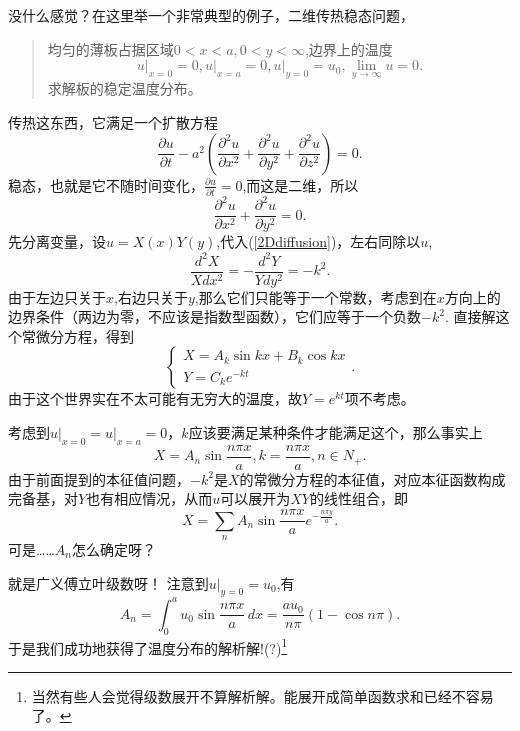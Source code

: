 \documentclass[12pt,a4paper,openany,twoside]{book}
\numberwithin{equation}{section}
\begin{document}
    没什么感觉？在这里举一个非常典型的例子，二维传热稳态问题，
    \begin{quote}
	    均匀的薄板占据区域$0<x<a,0<y<\infty$,边界上的温度
	    \[
		    u\big|_{x=0} = 0, u\big|_{x=a} = 0, u\big|_{y=0} = u_0, \lim_{y \to \infty} u =0
	    .\] 
	    求解板的稳定温度分布。
    \end{quote}
    传热这东西，它满足一个扩散方程
    \begin{equation}
	    \frac{\partial u}{\partial t} -a^2 (\frac{\partial ^2 u}{\partial x^2 } + \frac{\partial^2 u}{\partial y^2} + \frac{\partial ^2 u}{\partial z^2}  ) = 0.
    \end{equation}
    稳态，也就是它不随时间变化，$\frac{\partial u}{\partial t} = 0$,而这是二维，所以
    \begin{equation}
	    \frac{\partial ^2 u}{\partial x^2 } + \frac{\partial ^2 u}{\partial y^2 } = 0.
	    \label{2Ddiffusion}
    \end{equation}
    先分离变量，设$u=X(x)Y(y)$,代入(\ref{2Ddiffusion})，左右同除以$u$,
    \begin{equation}
	     \frac{d ^2 X}{X d x^2} = - \frac{d ^2 Y}{Y d y^2} = -k^2 .
    \end{equation}
    由于左边只关于$x$,右边只关于$y$,那么它们只能等于一个常数，考虑到在$x$方向上的边界条件（两边为零，不应该是指数型函数），它们应等于一个负数$-k^2$.
    直接解这个常微分方程，得到
    \begin{equation}
    	\begin{cases}
		X = A_k\sin{kx} + B_k\cos{kx} \\
		Y = C_k e^{-kt}
    	\end{cases}.
    \end{equation}
    由于这个世界实在不太可能有无穷大的温度，故$Y = e^{kt}$项不考虑。

    考虑到$u\big|_{x=0} = u\big|_{x=a} = 0$，$k$应该要满足某种条件才能满足这个，那么事实上
    \begin{equation}
	    X = A_n \sin{\frac{n\pi x}{a}} , k = \frac{n\pi x}{a}, n \in N_+.
    \end{equation}
    由于前面提到的本征值问题，$-k^2$是$X$的常微分方程的本征值，对应本征函数构成完备基，对$Y$也有相应情况，从而$u$可以展开为$XY$的线性组合，即
    \begin{equation}
	    X = \sum_n A_n \sin{\frac{n\pi x}{a}} e^{- \frac{n\pi y}{a}}.
    \end{equation}
    可是……$A_n$怎么确定呀？
    
    就是广义傅立叶级数呀！
    注意到$u\big|_{y=0} = u_0$,有
    \begin{equation}
	    A_n = \int ^a_0 u_0 \sin{\frac{n\pi x}{a}} \, dx = \frac{a u_0}{n\pi} (1-\cos{n\pi}) .
    \end{equation}
    于是我们成功地获得了温度分布的解析解!(?)\footnote{当然有些人会觉得级数展开不算解析解。能展开成简单函数求和已经不容易了。}
\end{document}
